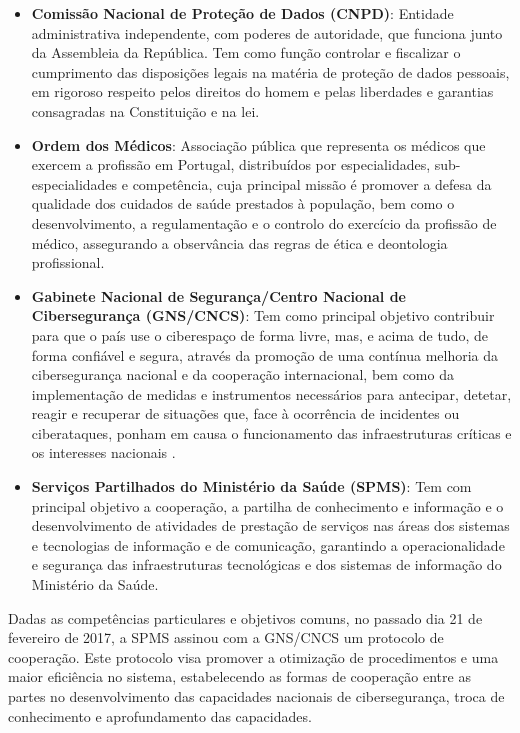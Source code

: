 \documentclass[conference]{IEEEtran}
\begin{document}
\begin{itemize}

	\item \textbf{Comissão Nacional de Proteção de Dados (CNPD)}: Entidade administrativa independente, com poderes de autoridade, que funciona junto da Assembleia da República. Tem como função controlar e fiscalizar o cumprimento das disposições legais na matéria de proteção de dados pessoais, em rigoroso respeito pelos direitos do homem e pelas liberdades e garantias consagradas na Constituição e na lei.
	
	\item \textbf{Ordem dos Médicos}: Associação pública que representa os médicos que exercem a profissão em Portugal, distribuídos por especialidades, sub-especialidades e competência, cuja principal missão é promover a defesa da qualidade dos cuidados de saúde prestados à população, bem como o desenvolvimento, a regulamentação e o controlo do exercício da profissão de médico, assegurando a observância das regras de ética e deontologia profissional.
	
	\item \textbf{Gabinete Nacional de Segurança/Centro Nacional de Cibersegurança (GNS/CNCS)}: Tem como principal objetivo contribuir para que o país use o ciberespaço de forma livre, mas, e acima de tudo, de forma confiável e segura, através da promoção de uma contínua melhoria da cibersegurança nacional e da cooperação internacional, bem como da implementação de medidas e instrumentos necessários para antecipar, detetar, reagir e recuperar de situações que, face à ocorrência de incidentes ou ciberataques, ponham em causa o funcionamento das infraestruturas críticas e os interesses nacionais \cite{colabCNCS_SPMS}.
	
	\item \textbf{Serviços Partilhados do Ministério da Saúde (SPMS)}: Tem com principal objetivo a cooperação, a partilha de conhecimento e informação e o desenvolvimento de atividades de prestação de serviços nas áreas dos sistemas e tecnologias de informação e de comunicação, garantindo a operacionalidade e segurança das infraestruturas tecnológicas e dos sistemas de informação do Ministério da Saúde.

\end{itemize}

Dadas as competências particulares e objetivos comuns, no passado dia 21 de fevereiro de 2017, a SPMS assinou com a GNS/CNCS um protocolo de cooperação. Este protocolo visa promover a otimização de procedimentos e uma maior eficiência no sistema, estabelecendo as formas de cooperação entre as partes no desenvolvimento das capacidades nacionais de cibersegurança, troca de conhecimento e aprofundamento das capacidades.
\end{document}

